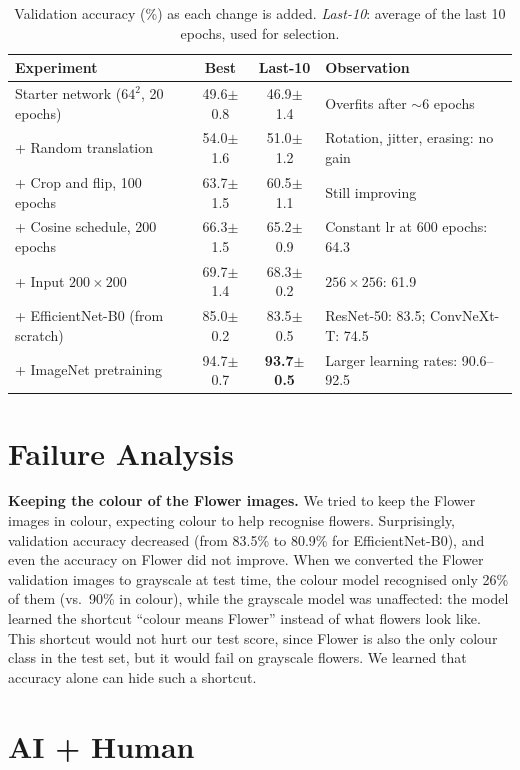 \documentclass{article}
\begin{document}
\begin{table}[t]
\centering
\small
\caption{Validation accuracy (\%) as each change is added. \emph{Last-10}: average of the last 10 epochs, used for selection.}
\label{tab:journey}
\begin{tabular}{lccl}
\toprule
Experiment & Best & Last-10 & Observation \\
\midrule
Starter network ($64^2$, 20 epochs) & 49.6$\pm$0.8 & 46.9$\pm$1.4 & Overfits after ${\sim}$6 epochs \\
+ Random translation & 54.0$\pm$1.6 & 51.0$\pm$1.2 & Rotation, jitter, erasing: no gain \\
+ Crop and flip, 100 epochs & 63.7$\pm$1.5 & 60.5$\pm$1.1 & Still improving \\
+ Cosine schedule, 200 epochs & 66.3$\pm$1.5 & 65.2$\pm$0.9 & Constant lr at 600 epochs: 64.3 \\
+ Input $200\times200$ & 69.7$\pm$1.4 & 68.3$\pm$0.2 & $256\times256$: 61.9 \\
+ EfficientNet-B0 (from scratch) & 85.0$\pm$0.2 & 83.5$\pm$0.5 & ResNet-50: 83.5; ConvNeXt-T: 74.5 \\
+ ImageNet pretraining & 94.7$\pm$0.7 & \textbf{93.7$\pm$0.5} & Larger learning rates: 90.6--92.5 \\
\bottomrule
\end{tabular}
\end{table}

\section{Failure Analysis}
\label{sec:failure}

\textbf{Keeping the colour of the Flower images.} We tried to keep the Flower images in colour, expecting colour to help recognise flowers. Surprisingly, validation accuracy decreased (from 83.5\% to 80.9\% for EfficientNet-B0), and even the accuracy on Flower did not improve. When we converted the Flower validation images to grayscale at test time, the colour model recognised only 26\% of them (vs.\ 90\% in colour), while the grayscale model was unaffected: the model learned the shortcut ``colour means Flower'' instead of what flowers look like. This shortcut would not hurt our test score, since Flower is also the only colour class in the test set, but it would fail on grayscale flowers. We learned that accuracy alone can hide such a shortcut.

\section{AI + Human}
\label{sec:ai}
\end{document}
